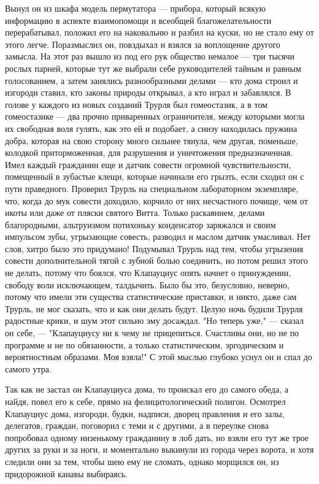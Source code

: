 Вынул он из шкафа модель пермутатора --- прибора, который
всякую информацию в аспекте взаимопомощи и всеобщей
благожелательности перерабатывал, положил его на наковальню
и разбил на куски, но не стало ему от этого легче.
Поразмыслил он, повздыхал и взялся за воплощение другого
замысла. На этот раз вышло из под его рук общество немалое --- три
тысячи рослых парней, которые тут же выбрали себе
руководителей тайным и равным голосованием, а затем занялись
разнообразными делами --- кто дома строил и изгороди ставил,
кто законы природы открывал, а кто играл и забавлялся. В
голове у каждого из новых созданий Трурля был гомеостазик, а
в том гомеостазике --- два прочно приваренных ограничителя,
между которыми могла их свободная воля гулять, как это ей и
подобает, а снизу находилась пружина добра, которая на свою
сторону много сильнее тянула, чем другая, поменьше, колодкой
приторможенная, для разрушения и уничтожения
предназначенная. Имел каждый гражданин еще и датчик совести
огромной чувствительности, помещенный в зубастые клещи,
которые начинали его грызть, если сходил он с пути
праведного. Проверил Трурль на специальном лабораторном
экземпляре, что, когда до мук совести доходило, корчило от
них несчастного почище, чем от икоты или даже от пляски
святого Витта. Только раскаянием, делами благородными,
альтруизмом потихоньку конденсатор заряжался и своим
импульсом зубы, угрызающие совесть, разводил и маслом датчик
умасливал. Нет слов, хитро было это придумано! Подумывал
Трурль над тем, чтобы угрызения совести дополнительной тягой
с зубной болью соединить, но потом решил этого не делать,
потому что боялся, что Клапауциус опять начнет о
принуждении, свободу воли исключающем, талдычить. Было бы
это, безусловно, неверно, потому что имели эти существа
статистические приставки, и никто, даже сам Трурль, не мог
сказать, что и как они делать будут. Целую ночь будили
Трурля радостные крики, и шум этот сильно эму досаждал. "Но
теперь уже," --- сказал он себе, --- "Клапауциусу ни к чему не
прицепиться. Счастливы они, но не по программе и не по
обязанности, а только статистическим, эргодическим и
вероятностным образами. Моя взяла!" С этой мыслью глубоко
уснул он и спал до самого утра.

Так как не застал он Клапауциуса дома, то проискал его до
самого обеда, а найдя, повел его к себе, прямо на
фелицитологический полигон. Осмотрел Клапауциус дома,
изгороди, будки, надписи, дворец правления и его залы,
делегатов, граждан, поговорил с теми и с другими, а в
переулке снова попробовал одному низенькому гражданину в лоб
дать, но взяли его тут же трое других за руки и за ноги, и
моментально выкинули из города через ворота, и хотя следили
они за тем, чтобы шею ему не сломать, однако морщился он, из
придорожной канавы выбираясь.

